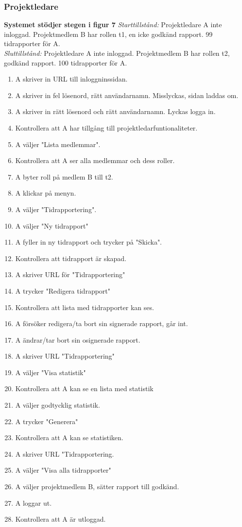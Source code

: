 \documentclass[a4paper]{article}
\begin{document}
\subsubsection{Projektledare}


\begin{ST}
\item 
\textbf{Systemet stödjer stegen i figur 7}
\emph{Starttillstånd:} Projektledare A inte inloggad. Projektmedlem B har rollen t1, en icke godkänd rapport. 99 tidrapporter för A.\\
\emph{Sluttillstånd:} Projektledare A inte inloggad. Projektmedlem B har rollen t2, godkänd rapport. 100 tidrapporter för A.\\

\begin{enumerate}

\item A skriver in URL till inloggninssidan.
\item A skriver in fel lösenord, rätt användarnamn. Misslyckas, sidan laddas om.
\item A skriver in rätt lösenord och rätt användarnamn. Lyckas logga in.
\item Kontrollera att A har tillgång till projektledarfuntionaliteter.
\item A väljer "Lista medlemmar".
\item Kontrollera att A ser alla medlemmar och dess roller.
\item A byter roll på medlem B till t2.
\item A klickar på menyn.
\item A väljer "Tidrapportering".
\item A väljer "Ny tidrapport"
\item A fyller in ny tidrapport och trycker på "Skicka".
\item Kontrollera att tidrapport är skapad.
\item A skriver URL för "Tidrapportering"
\item A trycker "Redigera tidrapport"
\item Kontrollera att lista med tidrapporter kan ses.
\item A försöker redigera/ta bort sin signerade rapport, går int.
\item A ändrar/tar bort sin osignerade rapport.
\item A skriver URL "Tidrapportering"
\item A väljer "Visa statistik"
\item Kontrollera att A kan se en lista med statistik
\item A väljer godtycklig statistik.
\item A trycker "Generera"
\item Kontrollera att A kan se statistiken.
\item A skriver URL "Tidrapportering.
\item A väljer "Visa alla tidrapporter"
\item A väljer projektmedlem B, sätter rapport till godkänd.
\item A loggar ut.
\item Kontrollera att A är utloggad.




\end{enumerate}
\end{ST}
\end{document}
